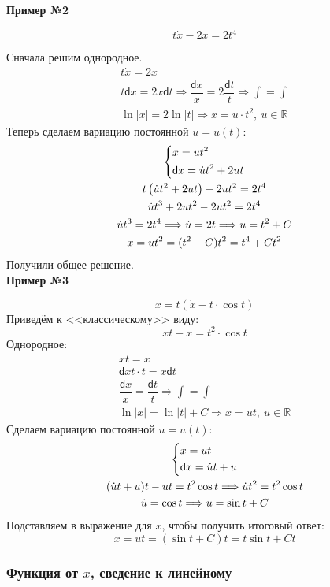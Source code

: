 \documentclass[a4paper,12pt]{article}
\newcommand{\R}{\mathbb{R}}
\renewcommand{\d}{\mathsf{d}}
\newcommand{\du}{\dot{u}}
\newcommand{\dx}{\dot{x}}
\newcommand{\ds}{\displaystyle}
\begin{document}
\textbf{Пример №2}

\[t\dx - 2x = 2t^4\]

Сначала решим однородное.
\begin{gather*}
	t\dx = 2x\\
	t\d x = 2x \d t \Longrightarrow \dfrac{\d x}{x} = 2\dfrac{\d t}{t} \Longrightarrow \ds\int=\int\\
	\ln|x| = 2\ln|t| \Longrightarrow x = u\cdot t^2,\ u \in \R
\end{gather*}
Теперь сделаем вариацию постоянной $u = u(t)$:
\begin{gather*}
	\left\{\begin{gathered}
	x = ut^2\hfill\\
	\d x = \du t^2 + 2ut\hfill
	\end{gathered}\right.\\
	t\left(\du t^2 + 2ut\right) - 2ut^2 = 2t^4\\
	\du t^3 +2ut^2 - 2ut^2 = 2t^4\\
	\du t^3 = 2t^4 \Longrightarrow \du = 2t \Longrightarrow u = t^2 + C\\
	x = ut^2 = (t^2 + C)t^2 = t^4 + Ct^2
\end{gather*}
Получили общее решение.
\ \\

\textbf{Пример №3}

\[x = t(\dx - t\cdot\cos t)\]
Приведём к <<классическому>> виду:
\[\dx t - x = t^2\cdot \cos t\]
Однородное:
\begin{gather*}
\dx t = x\\
\d x t \cdot t = x\d t\\
\dfrac{\d x}{x} = \dfrac{\d t}{t} \Longrightarrow \ds\int = \int\\
\ln|x| = \ln|t| + C \Longrightarrow x = ut,\ u \in \R
\end{gather*}
Сделаем вариацию постоянной $u = u(t)$:\
\begin{gather*}
\left\{\begin{gathered}
x = ut\hfill\\
\d x = \du t + u\hfill
\end{gathered}\right.\\
(\du t + u)t - ut = t^2\cos t \Longrightarrow \du t^2 = t^2\cos t\\
\du = \cos t \Longrightarrow u = \sin t + C
\end{gather*}
Подставляем в выражение для $x$, чтобы получить итоговый ответ:
\[x = ut = (\sin t + C)t = t\sin t + Ct\]

\subsubsection{Функция от $x$, сведение к линейному}
\end{document}

